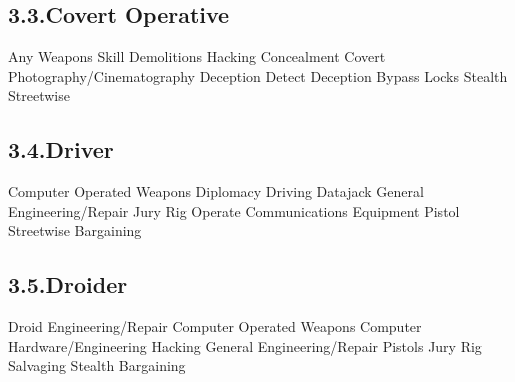 \documentclass{article}
\begin{document}
\subsection{3.3.\hspace*{0.5em}Covert Operative}\label{sec-covert-operative}%

\noindent{}Any Weapons Skill\mdbr
{}Demolitions\mdbr
{}Hacking\mdbr
{}Concealment\mdbr
{}Covert Photography/Cinematography\mdbr
{}Deception\mdbr
{}Detect Deception\mdbr
{}Bypass Locks\mdbr
{}Stealth\mdbr
{}Streetwise %

\subsection{3.4.\hspace*{0.5em}Driver}\label{sec-driver}%

\noindent{}Computer Operated Weapons\mdbr
{}Diplomacy\mdbr
{}Driving\mdbr
{}Datajack\mdbr
{}General Engineering/Repair\mdbr
{}Jury Rig\mdbr
{}Operate Communications Equipment\mdbr
{}Pistol\mdbr
{}Streetwise\mdbr
{}Bargaining %

\subsection{3.5.\hspace*{0.5em}Droider}\label{sec-droider}%

\noindent{}Droid Engineering/Repair\mdbr
{}Computer Operated Weapons\mdbr
{}Computer Hardware/Engineering\mdbr
{}Hacking\mdbr
{}General Engineering/Repair\mdbr
{}Pistols\mdbr
{}Jury Rig\mdbr
{}Salvaging\mdbr
{}Stealth\mdbr
{}Bargaining %
\end{document}
